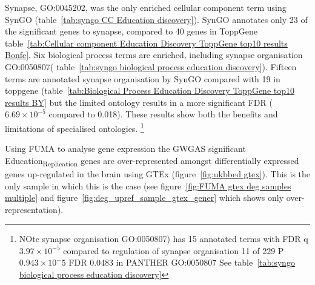             
 
 
 
 Synapse, GO:0045202, was the only enriched cellular component term using SynGO (table~\ref{tab:syngo CC Education discovery}).
SynGO annotates only 23 of the significant genes to synapse, compared to 40 genes in ToppGene table~\ref{tab:Cellular component Education Discovery ToppGene top10 results Bonfe}. Six biological process terms are enriched,  including synapse organisation GO:0050807( table~\ref{tab:syngo biological process education discovery}). Fifteen terms are annotated synapse organisation by SynGO compared with 19 in toppgene (table~\ref{tab:Biological Process Education Discovery ToppGene top10 results BY} but the limited ontology results in a more significant FDR ($6.69\times10^{-5}$ compared to 0.018). These results show both the benefits and limitations of specialised ontologies.      \footnote{      NOte synapse organisation GO:0050807) has 15 annotated terms with FDR q $3.97\times10^{-5}$ compared to regulation of synapse organisation 11 of 229 P $0.943\times{10^-5}$ FDR 0.0483 in PANTHER GO:0050807
 See table~\ref{tab:syngo biological process education discovery}}

 
 Using FUMA to analyse gene expression the GWGAS significant Education\textsubscript{Replication} genes are over-represented amongst  differentially expressed genes up-regulated in the brain using GTEx (figure~\ref{fig:ukbbed gtex}). This is the only sample in which this is the case (see figure~\ref{fig:FUMA gtex deg samples multiple} and figure~\ref{fig:deg_upref_sample_gtex_gener} which shows only over-representation). 





